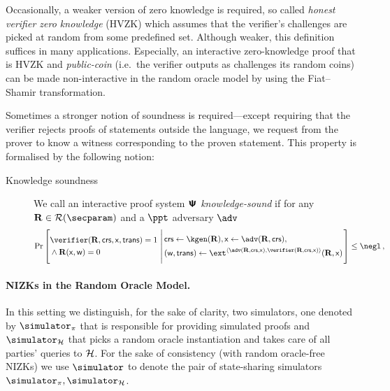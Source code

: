 \let\accentvec\vec \documentclass[runningheads,10pt]{llncs}
\begin{document}
	Occasionally, a weaker version of zero knowledge is required, so called
	\emph{honest verifier zero knowledge} (HVZK) which assumes that the
	verifier's challenges are picked at random from some predefined set.
	Although weaker, this definition suffices in many applications. Especially,
	an interactive zero-knowledge proof that is HVZK and \emph{public-coin}
	(i.e.~the verifier outputs as challenges its random coins) can be made
	non-interactive in the random oracle model by using the Fiat--Shamir
	transformation.
	
	Sometimes a stronger notion of soundness is required---except requiring that the verifier rejects proofs of statements outside the language, we request from the prover to know a witness corresponding to the proven statement. This property is formalised by the following notion:
\begin{description}
	\item[Knowledge soundness] We call an interactive proof system $\bm{\mathsf{\Psi}}$
			\emph{knowledge-sound} if for any $\REL \in \RELGEN(\secparam)$ and a $\ppt$ adversary $\adv$
	\[
	\Pr\left[
		\begin{aligned}
			& \verifier(\REL, \crs, \inp, \trans) = 1 \\
			& \land \REL(\inp, \wit) = 0
	 \end{aligned}
	  \,\left|\,
	 \begin{aligned}
		 & \crs \gets \kgen(\REL), \inp \gets \adv(\REL, \crs), \\
		 & (\wit, \trans) \gets \ext^{\ip{\adv(\REL, \crs, \inp)}{\verifier(\REL, \crs, \inp)}}(\REL, \inp)
	 \end{aligned}
	 \vphantom{\begin{aligned}
		 \adv (\trans) = 1, \\
		 \text{if $\trans{}$ is accepting} \\
		 \pcind \text{then $\REL(\inp, \wit)$}
	 \end{aligned}}\right.
	 \right] \leq \negl\,,
 \]
\end{description}

\paragraph{NIZKs in the Random Oracle Model.}
In this setting we distinguish, for the sake of clarity, two simulators, one denoted by $\simulator_\zkproof$ that is responsible for providing simulated proofs and $\simulator_\ro$ that picks a random oracle instantiation and takes care of all parties' queries to $\mathcal{H}$.
For the sake of consistency (with random oracle-free NIZKs) we use $\simulator$
to denote the pair of state-sharing simulators $\simulator_\zkproof,
\simulator_\ro$.
\end{document}
